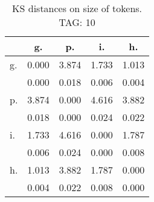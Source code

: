 \begin{table}[h!]
\begin{center}
\begin{tabular}{| l | c | c | c | c |}\hline
 & g. & p. & i. & h. \\\hline
g. & 0.000  & 3.874  & 1.733  & 1.013 \\\hline
 & 0.000  & 0.018  & 0.006  & 0.004 \\\hline
p. & 3.874  & 0.000  & 4.616  & 3.882 \\\hline
 & 0.018  & 0.000  & 0.024  & 0.022 \\\hline
i. & 1.733  & 4.616  & 0.000  & 1.787 \\\hline
 & 0.006  & 0.024  & 0.000  & 0.008 \\\hline
h. & 1.013  & 3.882  & 1.787  & 0.000 \\\hline
 & 0.004  & 0.022  & 0.008  & 0.000 \\\hline
\end{tabular}
\caption{KS distances on size of tokens. TAG: 10}
\end{center}
\end{table}